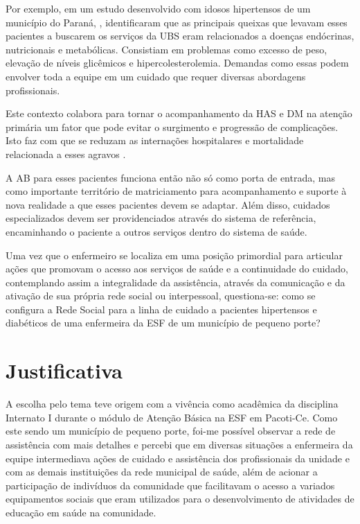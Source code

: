Por exemplo, em um estudo desenvolvido com idosos hipertensos de um município do Paraná, , identificaram que as principais queixas que levavam esses pacientes a buscarem os serviços da \acrshort{UBS} eram relacionados a doenças endócrinas, nutricionais e metabólicas. Consistiam em problemas como excesso de peso, elevação de níveis glicêmicos e hipercolesterolemia. Demandas como essas podem envolver toda a equipe em um cuidado que requer diversas abordagens profissionais. 

Este contexto colabora para tornar o acompanhamento da \acrshort{HAS} e \acrshort{DM} na atenção primária um fator que pode evitar o surgimento e progressão de complicações. Isto faz com que se reduzam as internações hospitalares e mortalidade relacionada a esses agravos \cite{da2012associaccao}.

A \acrshort{AB} para esses pacientes funciona então não só como porta de entrada, mas como importante território de matriciamento para acompanhamento e suporte à nova realidade a que esses pacientes devem se adaptar. Além disso, cuidados especializados devem ser providenciados através do sistema de referência, encaminhando o paciente a outros serviços dentro do sistema de saúde. 

Uma vez que o enfermeiro se localiza em uma posição primordial para articular ações que promovam o acesso aos serviços de saúde e a continuidade do cuidado, contemplando assim a integralidade da assistência, através da comunicação e da ativação de sua própria rede social ou interpessoal, questiona-se: como se configura a Rede Social para a linha de cuidado a pacientes hipertensos e diabéticos de uma enfermeira da \acrshort{ESF} de um município de pequeno porte?

\section{Justificativa}
A escolha pelo tema teve origem com a vivência como acadêmica da disciplina Internato I durante o módulo de Atenção Básica na \acrshort{ESF} em Pacoti-Ce. Como este sendo um município de pequeno porte, foi-me possível observar a rede de assistência com mais detalhes e percebi que em diversas situações a enfermeira da equipe intermediava ações de cuidado e assistência dos profissionais da unidade e com as demais instituições da rede municipal de saúde, além de acionar a participação de indivíduos da comunidade que facilitavam o acesso a variados equipamentos sociais que eram utilizados para o desenvolvimento de atividades de educação em saúde na comunidade. 

